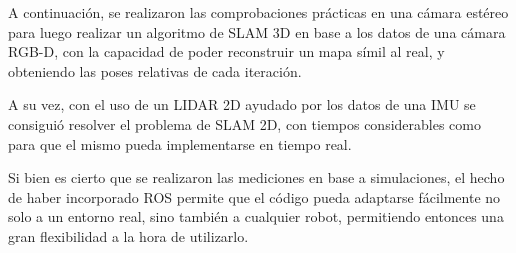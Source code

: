 A continuación, se realizaron las comprobaciones prácticas en una cámara estéreo para luego realizar un algoritmo de SLAM 3D en base a los datos de una cámara RGB-D, con la capacidad de poder reconstruir un mapa símil al real, y obteniendo las poses relativas de cada iteración. 

A su vez, con el uso de un LIDAR 2D ayudado por los datos de una IMU se consiguió resolver el problema de SLAM 2D, con tiempos considerables como para que el mismo pueda implementarse en tiempo real.

Si bien es cierto que se realizaron las mediciones en base a simulaciones, el hecho de haber incorporado ROS permite que el código pueda adaptarse fácilmente no solo a un entorno real, sino también a cualquier robot, permitiendo entonces una gran flexibilidad a la hora de utilizarlo. 


\fi